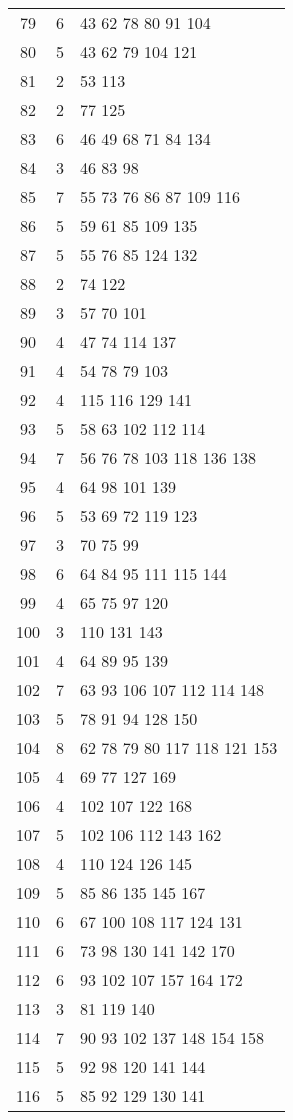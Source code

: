 \documentclass{standalone}
\begin{document}
\begin{tabular}{c c l}
79 & 6 & 43 62 78 80 91 104 \\
80 & 5 & 43 62 79 104 121 \\
81 & 2 & 53 113 \\
82 & 2 & 77 125 \\
83 & 6 & 46 49 68 71 84 134 \\
84 & 3 & 46 83 98 \\
85 & 7 & 55 73 76 86 87 109 116 \\
86 & 5 & 59 61 85 109 135 \\
87 & 5 & 55 76 85 124 132 \\
88 & 2 & 74 122 \\
89 & 3 & 57 70 101 \\
90 & 4 & 47 74 114 137 \\
91 & 4 & 54 78 79 103 \\
92 & 4 & 115 116 129 141 \\
93 & 5 & 58 63 102 112 114 \\
94 & 7 & 56 76 78 103 118 136 138 \\
95 & 4 & 64 98 101 139 \\
96 & 5 & 53 69 72 119 123 \\
97 & 3 & 70 75 99 \\
98 & 6 & 64 84 95 111 115 144 \\
99 & 4 & 65 75 97 120 \\
100 & 3 & 110 131 143 \\
101 & 4 & 64 89 95 139 \\
102 & 7 & 63 93 106 107 112 114 148 \\
103 & 5 & 78 91 94 128 150 \\
104 & 8 & 62 78 79 80 117 118 121 153 \\
105 & 4 & 69 77 127 169 \\
106 & 4 & 102 107 122 168 \\
107 & 5 & 102 106 112 143 162 \\
108 & 4 & 110 124 126 145 \\
109 & 5 & 85 86 135 145 167 \\
110 & 6 & 67 100 108 117 124 131 \\
111 & 6 & 73 98 130 141 142 170 \\
112 & 6 & 93 102 107 157 164 172 \\
113 & 3 & 81 119 140 \\
114 & 7 & 90 93 102 137 148 154 158 \\
115 & 5 & 92 98 120 141 144 \\
116 & 5 & 85 92 129 130 141 \\

\end{tabular}
\end{document}
